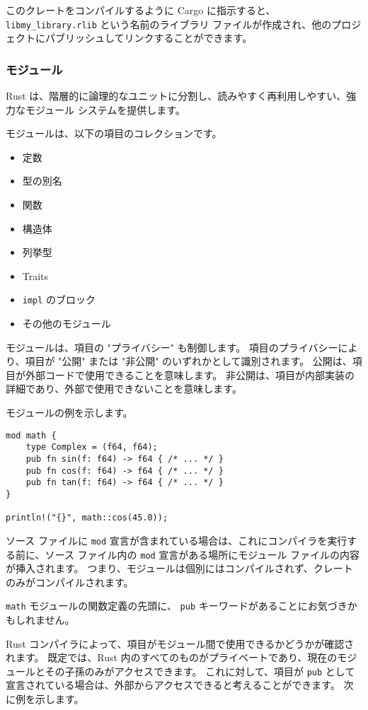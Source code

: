このクレートをコンパイルするように Cargo に指示すると、\texttt{libmy\_library.rlib} という名前のライブラリ ファイルが作成され、他のプロジェクトにパブリッシュしてリンクすることができます。

\subsubsection{モジュール}

Rust は、階層的に論理的なユニットに分割し、読みやすく再利用しやすい、強力なモジュール システムを提供します。

モジュールは、以下の項目のコレクションです。

\begin{itemize}
\item 定数
\item 型の別名
\item 関数
\item 構造体
\item 列挙型
\item Traits
\item \texttt{impl} のブロック
\item その他のモジュール
\end{itemize}

モジュールは、項目の "プライバシー" も制御します。 項目のプライバシーにより、項目が "公開" または "非公開" のいずれかとして識別されます。 公開は、項目が外部コードで使用できることを意味します。 非公開は、項目が内部実装の詳細であり、外部で使用できないことを意味します。

モジュールの例を示します。

\begin{lstlisting}[numbers=none]
mod math {
    type Complex = (f64, f64);
    pub fn sin(f: f64) -> f64 { /* ... */ }
    pub fn cos(f: f64) -> f64 { /* ... */ }
    pub fn tan(f: f64) -> f64 { /* ... */ }
}

println!("{}", math::cos(45.0));
\end{lstlisting}

ソース ファイルに \texttt{mod} 宣言が含まれている場合は、これにコンパイラを実行する前に、ソース ファイル内の \texttt{mod} 宣言がある場所にモジュール ファイルの内容が挿入されます。 つまり、モジュールは個別にはコンパイルされず、クレートのみがコンパイルされます。

\texttt{math} モジュールの関数定義の先頭に、 \texttt{pub} キーワードがあることにお気づきかもしれません。

Rust コンパイラによって、項目がモジュール間で使用できるかどうかが確認されます。 既定では、Rust 内のすべてのものがプライベートであり、現在のモジュールとその子孫のみがアクセスできます。 これに対して、項目が \texttt{pub} として宣言されている場合は、外部からアクセスできると考えることができます。 次に例を示します。

